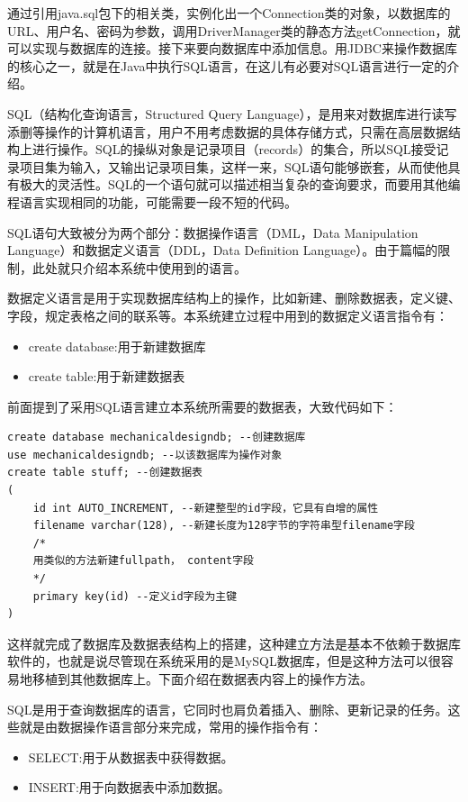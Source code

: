\documentclass[12pt,a4paper]{article}
\begin{document}
	通过引用java.sql包下的相关类，实例化出一个Connection类的对象，以数据库的URL、用户名、密码为参数，调用DriverManager类的静态方法getConnection，就可以实现与数据库的连接。接下来要向数据库中添加信息。用JDBC来操作数据库的核心之一，就是在Java中执行SQL语言，在这儿有必要对SQL语言进行一定的介绍。
	
	SQL（结构化查询语言，Structured Query Language），是用来对数据库进行读写添删等操作的计算机语言，用户不用考虑数据的具体存储方式，只需在高层数据结构上进行操作。SQL的操纵对象是记录项目（records）的集合，所以SQL接受记录项目集为输入，又输出记录项目集，这样一来，SQL语句能够嵌套，从而使他具有极大的灵活性。SQL的一个语句就可以描述相当复杂的查询要求，而要用其他编程语言实现相同的功能，可能需要一段不短的代码。
	
	SQL语句大致被分为两个部分：数据操作语言（DML，Data Manipulation Language）和数据定义语言（DDL，Data Definition Language）。由于篇幅的限制，此处就只介绍本系统中使用到的语言。
	
	数据定义语言是用于实现数据库结构上的操作，比如新建、删除数据表，定义键、字段，规定表格之间的联系等。本系统建立过程中用到的数据定义语言指令有：
\begin{itemize}
	\item
	create database:用于新建数据库
	\item
	create table:用于新建数据表
\end{itemize}		
	
	前面提到了采用SQL语言建立本系统所需要的数据表，大致代码如下：
	
	\lstset{language=SQL,frame=lines}
	\begin{lstlisting}
create database mechanicaldesigndb; --创建数据库
use mechanicaldesigndb; --以该数据库为操作对象
create table stuff; --创建数据表
(
	id int AUTO_INCREMENT, --新建整型的id字段，它具有自增的属性
	filename varchar(128), --新建长度为128字节的字符串型filename字段
	/*
	用类似的方法新建fullpath， content字段
	*/
	primary key(id) --定义id字段为主键
)
	\end{lstlisting}	
	
	这样就完成了数据库及数据表结构上的搭建，这种建立方法是基本不依赖于数据库软件的，也就是说尽管现在系统采用的是MySQL数据库，但是这种方法可以很容易地移植到其他数据库上。下面介绍在数据表内容上的操作方法。
	
	SQL是用于查询数据库的语言，它同时也肩负着插入、删除、更新记录的任务。这些就是由数据操作语言部分来完成，常用的操作指令有：
	
	\begin{itemize}
		\item
	SELECT:用于从数据表中获得数据。
		\item
	INSERT:用于向数据表中添加数据。
	\end{itemize}
	
\end{document}
